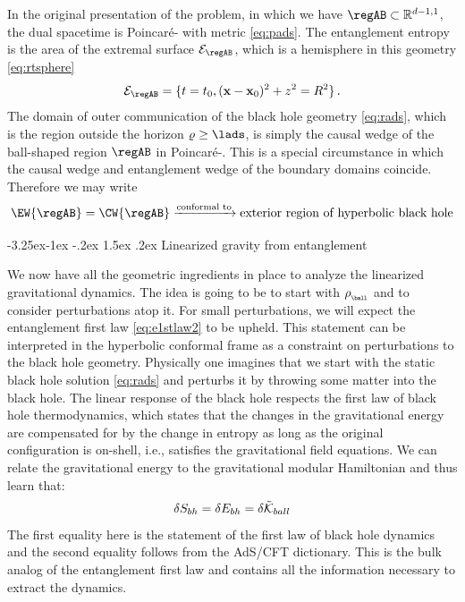 \documentclass[12pt,openany]{book}
\makeatletter
\renewcommand\subsection{\@startsection{subsection}{2}{\z@}%
                                     {-3.25ex\@plus -1ex \@minus -.2ex}%
                                     {1.5ex \@plus .2ex}%
                                     {\normalfont\bfseries}}
\makeatother
\begin{document}
In the original presentation of the problem, in which we have $\regAB \subset {\mathbb R}^{d-1,1}$, the dual spacetime is
Poincar\'e- with metric \eqref{eq:pads}.  The entanglement entropy is the area of the extremal surface ${\cal E}_{\regAB}$, which is a hemisphere in this geometry \eqref{eq:rtsphere}
%
\begin{equation}
{\cal E}_{\regAB} = \{ t = t_0, ({\bf x} - {\bf x}_0)^2 + z^2 = R^2 \} \,.
\label{eq:rts2}
\end{equation}
%
 The domain of outer communication of the black hole geometry \eqref{eq:rads}, which is the region outside the horizon $\varrho \geq \lads$,   is simply the causal wedge of the ball-shaped region $\regAB$ in Poincar\'e-. This is a special circumstance in which the causal wedge and entanglement wedge of the boundary domains coincide. Therefore we may write
%
\begin{equation}
\EW{\regAB} = \CW{\regAB} \xrightarrow{\text{conformal to}} \text{exterior region of hyperbolic black hole}
\end{equation}
%

\subsection{Linearized gravity from entanglement}
\label{sec:lingrav}

We now have all the geometric ingredients in place to analyze the linearized gravitational dynamics. The idea is going to be to start with $\rho_{_{\ball}}$ and to consider perturbations atop  it. For small perturbations, we will expect the entanglement first law
\eqref{eq:e1stlaw2} to be upheld. This statement can be interpreted in the hyperbolic conformal frame as a constraint on perturbations to the black hole geometry. Physically one imagines that we start with the static black hole solution \eqref{eq:rads} and perturbs it by throwing some matter into the black hole. The linear response of the black hole respects the first law of black hole thermodynamics, which states that the changes in the gravitational energy are  compensated for by the change in entropy as long as the original configuration is on-shell, i.e., satisfies the gravitational field equations. We can relate the gravitational energy to the  gravitational modular Hamiltonian  and thus learn that:
%
\begin{equation}
\delta S_{bh} =  \delta E_{bh} = \delta \tilde{{\cal K}}_{ball}
\label{eq:gravrels}
\end{equation}
%
The first equality here is the statement of the first law of black hole dynamics \cite{Iyer:1994ys} and the second equality follows from the AdS/CFT dictionary.  This is the bulk analog of the entanglement first law and contains all the information necessary to extract the dynamics.
\end{document}
